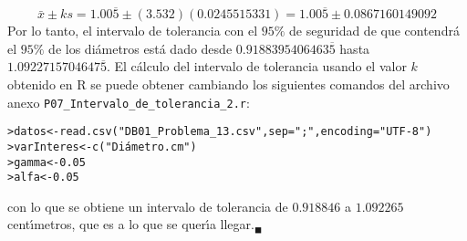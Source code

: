 \begin{solucion}
 \begin{equation*}
  \bar{x} \pm ks = 1.00\overline{5} \pm (3.532)(0.0245515331) = 1.00\overline{5} \pm 0.0867160149092
 \end{equation*}
 Por lo tanto, el intervalo de tolerancia con el $95\%$ de seguridad de que contendr\'a el $95\%$ de los di\'ametros est\'a dado desde $0.9188395406463\overline{5}$ hasta $1.0922715704647\overline{5}$. El c\'alculo del intervalo de tolerancia usando el valor $k$ obtenido en R se puede obtener cambiando los siguientes comandos del archivo anexo \texttt{P07\_Intervalo\_de\_tolerancia\_2.r}:
 \begin{verbatim}
>datos<-read.csv("DB01_Problema_13.csv",sep=";",encoding="UTF-8")
>varInteres<-c("Diámetro.cm")
>gamma<-0.05
>alfa<-0.05
 \end{verbatim}
 \vspace{-0.5cm}
 con lo que se obtiene un intervalo de tolerancia de $0.918846$ a $1.092265$ cent\'{\i}metros, que es a lo que se quer\'{\i}a llegar.${}_{\blacksquare}$
\end{solucion}
